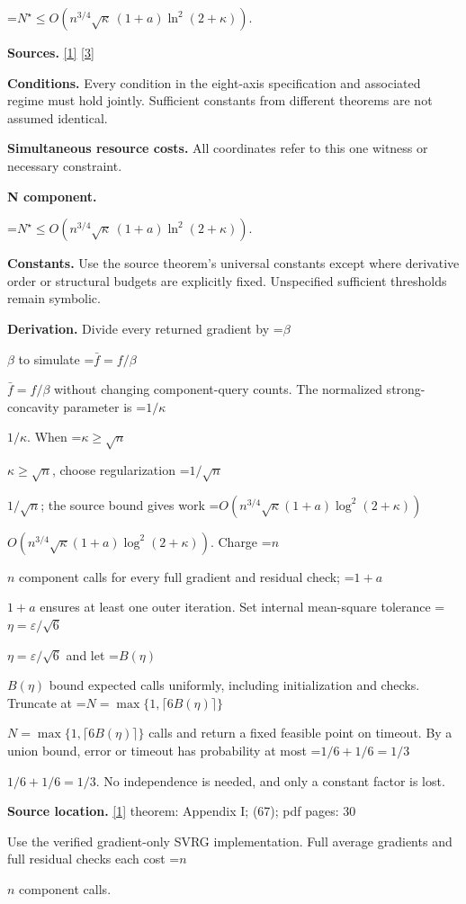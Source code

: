 \documentclass[10pt,a4paper]{article}
\newcommand{\AtlasMath}[1]{\par\begingroup\centering\setbox0=\hbox{$\displaystyle #1$}\ifdim\wd0>1.4\linewidth\typeout{ATLAS WIDE FORMULA: \the\wd0}\fi\ifdim\wd0>\linewidth\resizebox{\linewidth}{!}{\box0}\else\box0\fi\par\endgroup}
\newcommand{\AtlasInlineMath}[1]{\begingroup\setbox0=\hbox{$#1$}\ifdim\wd0>.4\linewidth\endgroup\AtlasMath{#1}\else\endgroup$#1$\fi}
\begin{document}
\AtlasMath{N^\star\le O\!\left(n^{3/4}\sqrt\kappa\,(1+a)\ln^2(2+\kappa)\right).}


\textbf{Sources.} \href{https://arxiv.org/pdf/2610.04944v1}{[1]} \href{https://arxiv.org/pdf/2103.15888v1}{[3]}



\textbf{Conditions.} Every condition in the eight-axis specification and associated regime must hold jointly. Sufficient constants from different theorems are not assumed identical.



\textbf{Simultaneous resource costs.} All coordinates refer to this one witness or necessary constraint.



\textbf{N component.}



\AtlasMath{N^\star\le O\!\left(n^{3/4}\sqrt\kappa\,(1+a)\ln^2(2+\kappa)\right).}


\textbf{Constants.} Use the source theorem’s universal constants except where derivative order or structural budgets are explicitly fixed. Unspecified sufficient thresholds remain symbolic.



\textbf{Derivation.} Divide every returned gradient by \AtlasInlineMath{\beta} to simulate \AtlasInlineMath{\bar f=f/\beta} without changing component-query counts. The normalized strong-concavity parameter is \AtlasInlineMath{1/\kappa}. When \AtlasInlineMath{\kappa\ge\sqrt n}, choose regularization \AtlasInlineMath{1/\sqrt n}; the source bound gives work \AtlasInlineMath{O(n^{3/4}\sqrt\kappa(1+a)\log^2(2+\kappa))}. Charge \AtlasInlineMath{n} component calls for every full gradient and residual check; \AtlasInlineMath{1+a} ensures at least one outer iteration. Set internal mean-square tolerance \AtlasInlineMath{\eta=\varepsilon/\sqrt6} and let \AtlasInlineMath{B(\eta)} bound expected calls uniformly, including initialization and checks. Truncate at \AtlasInlineMath{N=\max\{1,\lceil6B(\eta)\rceil\}} calls and return a fixed feasible point on timeout. By a union bound, error or timeout has probability at most \AtlasInlineMath{1/6+1/6=1/3}. No independence is needed, and only a constant factor is lost.



\textbf{Source location.} \href{https://arxiv.org/pdf/2610.04944v1}{[1]} theorem: Appendix I; (67); pdf pages: 30



Use the verified gradient-only SVRG implementation. Full average gradients and full residual checks each cost \AtlasInlineMath{n} component calls.
\end{document}
